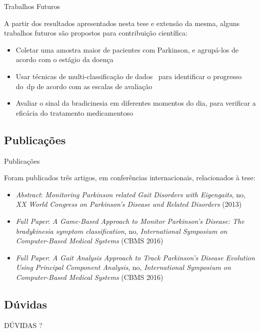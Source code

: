 \documentclass{beamer}
\begin{document}
\begin{frame}{Trabalhos Futuros}
\begin{block}{}
A partir dos resultados apresentados nesta tese e extensão da mesma, alguns trabalhos futuros são propostos para contribuição científica:
  \begin{itemize}
   \item Coletar uma amostra maior de pacientes com Parkinson, e agrupá-los de acordo com o estágio da doença~\cite{goul05}
   \item Usar técnicas de multi-classificação de dados~\cite{multisvm2011} para identificar o progresso do~\ac{dp} de acordo com as escalas de avaliação
   \item Avaliar o sinal da bradicinesia em diferentes momentos do dia, para verificar a eficácia do tratamento medicamentoso~\cite{protpar010}
  \end{itemize}
\end{block}
\end{frame}


\subsection{Publicações}
\begin{frame}{Publicações}
\begin{block}{}
Foram publicados três artigos, em conferências internacionais, relacionados à tese: 
  \begin{itemize}
   \item \textit{Abstract}: \textit{Monitoring Parkinson related Gait Disorders with Eigengaits}, no, \textit{XX World Congress on Parkinson's Disease and Related Disorders} (2013)~\cite{lmmeigengaits2013}
   \item \textit{Full Paper}: \textit{A Game-Based Approach to Monitor Parkinson’s Disease: The bradykinesia symptom classification}, no, \textit{International Symposium on Computer-Based Medical Systems} (CBMS 2016)~\cite{lmmcbmsgame2016}
   \item \textit{Full Paper}: \textit{A Gait Analysis Approach to Track Parkinson’s Disease Evolution Using Principal Component Analysis}, no, \textit{International Symposium on Computer-Based Medical Systems} (CBMS 2016)~\cite{lmmcbmsgait2016}
  \end{itemize}
\end{block}
\end{frame}

\subsection{Dúvidas}
\begin{frame}
  \begin{center}
  DÚVIDAS ?
  \end{center}
\end{frame}


\end{document}
